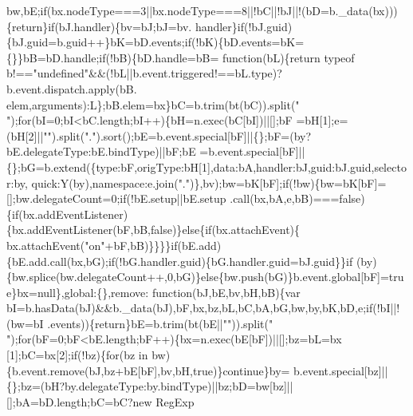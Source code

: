 \begin{DoxyCode}
      bw,bE;\textcolor{keywordflow}{if}(bx.nodeType===3||bx.nodeType===8||!bC||!bJ||!(bD=b.\_data(bx)))\{\textcolor{keywordflow}{return}\}\textcolor{keywordflow}{if}(bJ.handler)\{bv=bJ;bJ=bv.
      handler\}\textcolor{keywordflow}{if}(!bJ.guid)\{bJ.guid=b.guid++\}bK=bD.events;\textcolor{keywordflow}{if}(!bK)\{bD.events=bK=\{\}\}bB=bD.handle;\textcolor{keywordflow}{if}(!bB)\{bD.handle=bB=\textcolor{keyword}{
      function}(bL)\{\textcolor{keywordflow}{return} typeof b!==\textcolor{stringliteral}{"undefined"}&&(!bL||b.event.triggered!==bL.type)?b.event.dispatch.apply(bB.
      elem,arguments):L\};bB.elem=bx\}bC=b.trim(bt(bC)).split(\textcolor{stringliteral}{" "});\textcolor{keywordflow}{for}(bI=0;bI<bC.length;bI++)\{bH=n.exec(bC[bI])||[];bF
      =bH[1];e=(bH[2]||\textcolor{stringliteral}{""}).split(\textcolor{stringliteral}{"."}).sort();bE=b.event.special[bF]||\{\};bF=(by?bE.delegateType:bE.bindType)||bF;bE
      =b.event.special[bF]||\{\};bG=b.extend(\{type:bF,origType:bH[1],data:bA,handler:bJ,guid:bJ.guid,selector:by,
      quick:Y(by),\textcolor{keyword}{namespace}:e.join(\textcolor{stringliteral}{"."})\},bv);bw=bK[bF];\textcolor{keywordflow}{if}(!bw)\{bw=bK[bF]=[];bw.delegateCount=0;\textcolor{keywordflow}{if}(!bE.setup||bE.setup
      .call(bx,bA,e,bB)===\textcolor{keyword}{false})\{\textcolor{keywordflow}{if}(bx.addEventListener)\{bx.addEventListener(bF,bB,\textcolor{keyword}{false})\}\textcolor{keywordflow}{else}\{\textcolor{keywordflow}{if}(bx.attachEvent)\{
      bx.attachEvent(\textcolor{stringliteral}{"on"}+bF,bB)\}\}\}\}\textcolor{keywordflow}{if}(bE.add)\{bE.add.call(bx,bG);\textcolor{keywordflow}{if}(!bG.handler.guid)\{bG.handler.guid=bJ.guid\}\}\textcolor{keywordflow}{if}
      (by)\{bw.splice(bw.delegateCount++,0,bG)\}\textcolor{keywordflow}{else}\{bw.push(bG)\}b.event.global[bF]=\textcolor{keyword}{true}\}bx=null\},global:\{\},\textcolor{keyword}{remove}:\textcolor{keyword}{
      function}(bJ,bE,bv,bH,bB)\{var bI=b.hasData(bJ)&&b.\_data(bJ),bF,bx,bz,bL,bC,bA,bG,bw,by,bK,bD,e;\textcolor{keywordflow}{if}(!bI||!(bw=bI
      .events))\{\textcolor{keywordflow}{return}\}bE=b.trim(bt(bE||\textcolor{stringliteral}{""})).split(\textcolor{stringliteral}{" "});\textcolor{keywordflow}{for}(bF=0;bF<bE.length;bF++)\{bx=n.exec(bE[bF])||[];bz=bL=bx
      [1];bC=bx[2];\textcolor{keywordflow}{if}(!bz)\{\textcolor{keywordflow}{for}(bz in bw)\{b.event.remove(bJ,bz+bE[bF],bv,bH,\textcolor{keyword}{true})\}\textcolor{keywordflow}{continue}\}by=
      b.event.special[bz]||\{\};bz=(bH?by.delegateType:by.bindType)||bz;bD=bw[bz]||[];bA=bD.length;bC=bC?\textcolor{keyword}{new} RegExp

\end{DoxyCode}
